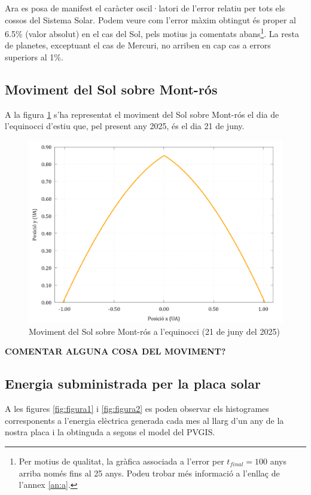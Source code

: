 \documentclass[10pt, twoside, a4paper]{article}
\begin{document}
Ara es posa de manifest el caràcter oscil·latori de l'error relatiu per tots els cossos del Sistema Solar. Podem veure com l'error màxim obtingut és proper al 6.5\% (valor absolut) en el cas del Sol, pels motius ja comentats abans\footnote{Per motius de qualitat, la gràfica associada a l'error per $t_{final}=100$ anys arriba només fins al 25 anys. Podeu trobar més informació a l'enllaç de l'annex \ref{an:a}.}. La resta de planetes, exceptuant el cas de Mercuri, no arriben en cap cas a errors superiors al 1\%.

\subsection{Moviment del Sol sobre Mont-rós}
A la figura \ref{fig:movsol} s'ha representat el moviment del Sol sobre Mont-rós el dia de l'equinocci d'estiu que, pel present any 2025, és el dia 21 de juny.

\begin{figure}[h!]
    \centering
    \includegraphics[width=0.7\linewidth]{mov_sol_equinocci.png}
    \caption{Moviment del Sol sobre Mont-rós a l'equinocci (21 de juny del 2025)}
    \label{fig:movsol}
\end{figure}

\textbf{COMENTAR ALGUNA COSA DEL MOVIMENT?}


\subsection{Energia subministrada per la placa solar}
A les figures \ref{fig:figura1} i \ref{fig:figura2} es poden observar els histogrames corresponents a l'energia elèctrica generada cada mes al llarg d'un any de la nostra placa i la obtinguda a segons el model del PVGIS. 
\end{document}
